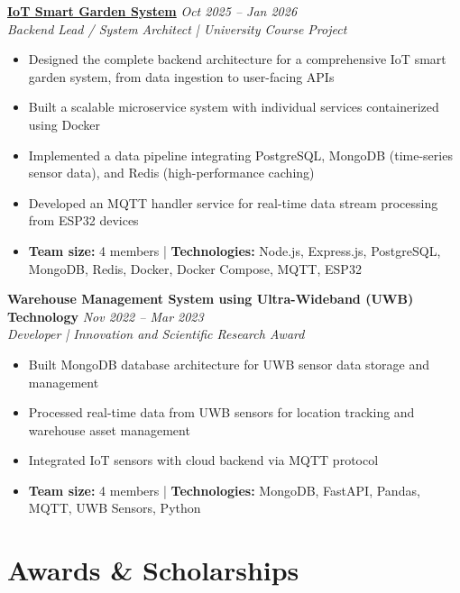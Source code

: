 \documentclass[11pt,a4paper]{article}
\newcommand{\cventry}[4]{
  \noindent\textbf{#1} \hfill \textit{#2} \\
  \textit{#3} \\
  #4
  \vspace{0.4em}
}
\begin{document}
\cventry
  {\href{https://github.com/AndrewHaward2310/IoTSmartGardenSystem}{IoT Smart Garden System}}
  {Oct 2025 -- Jan 2026}
  {Backend Lead / System Architect | University Course Project}
  {
    \begin{itemize}[leftmargin=1.5em, topsep=0pt, itemsep=0.15em]
      \item Designed the complete backend architecture for a comprehensive IoT smart garden system, from data ingestion to user-facing APIs
      \item Built a scalable microservice system with individual services containerized using Docker
      \item Implemented a data pipeline integrating PostgreSQL, MongoDB (time-series sensor data), and Redis (high-performance caching)
      \item Developed an MQTT handler service for real-time data stream processing from ESP32 devices
      \item \textbf{Team size:} 4 members \quad | \quad \textbf{Technologies:} Node.js, Express.js, PostgreSQL, MongoDB, Redis, Docker, Docker Compose, MQTT, ESP32
    \end{itemize}
  }

\cventry
  {Warehouse Management System using Ultra-Wideband (UWB) Technology}
  {Nov 2022 -- Mar 2023}
  {Developer | Innovation and Scientific Research Award}
  {
    \begin{itemize}[leftmargin=1.5em, topsep=0pt, itemsep=0.15em]
      \item Built MongoDB database architecture for UWB sensor data storage and management
      \item Processed real-time data from UWB sensors for location tracking and warehouse asset management
      \item Integrated IoT sensors with cloud backend via MQTT protocol
      \item \textbf{Team size:} 4 members \quad | \quad \textbf{Technologies:} MongoDB, FastAPI, Pandas, MQTT, UWB Sensors, Python
    \end{itemize}
  }

\section{Awards \& Scholarships}
\end{document}
